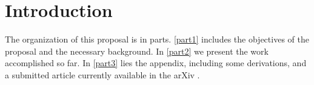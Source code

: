 \chapter{Introduction}



The organization of this proposal is in parts. \autoref{part1} includes the objectives of the proposal
and the necessary background. In \autoref{part2} we present the work accomplished so far. In \autoref{part3}
lies the appendix, including some derivations, and a submitted article currently available in the arXiv \cite{de_leeuw_diffusion_2012}.
